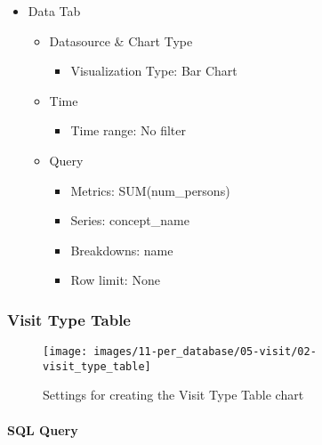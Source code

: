 \documentclass[
]{book}
\providecommand{\tightlist}{%
  \setlength{\itemsep}{0pt}\setlength{\parskip}{0pt}}
\begin{document}
\begin{itemize}
\tightlist
\item
  Data Tab

  \begin{itemize}
  \tightlist
  \item
    Datasource \& Chart Type

    \begin{itemize}
    \tightlist
    \item
      Visualization Type: Bar Chart
    \end{itemize}
  \item
    Time

    \begin{itemize}
    \tightlist
    \item
      Time range: No filter
    \end{itemize}
  \item
    Query

    \begin{itemize}
    \tightlist
    \item
      Metrics: SUM(num\_persons)
    \item
      Series: concept\_name
    \item
      Breakdowns: name
    \item
      Row limit: None
    \end{itemize}
  \end{itemize}
\end{itemize}

\hypertarget{visit-type-table}{%
\subsubsection*{Visit Type Table}\label{visit-type-table}}

\begin{figure}
\texttt{[image: images/11-per\_database/05-visit/02-visit\_type\_table]} \caption{Settings for creating the Visit Type Table chart}\label{fig:visitTypeTable}
\end{figure}

\hypertarget{sql-query-33}{%
\paragraph*{SQL Query}\label{sql-query-33}}
\end{document}
